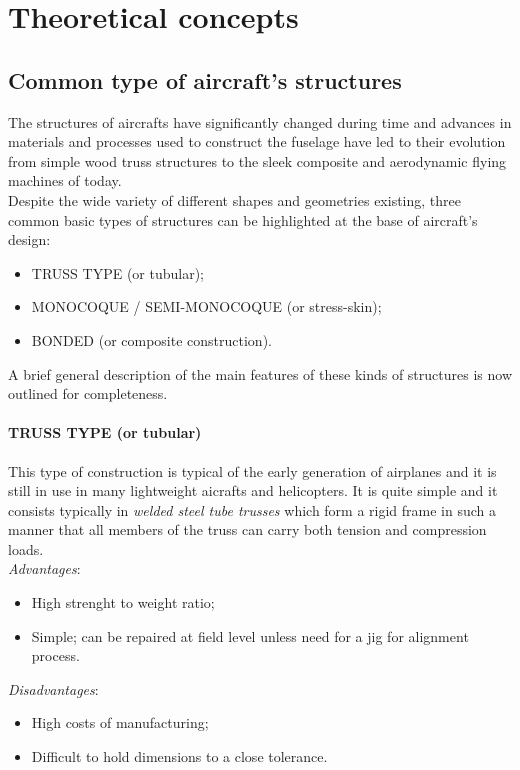 \chapter{Theoretical concepts}


\section*{Common type of aircraft's structures}
\noindent
The structures of aircrafts have significantly changed during time and advances in materials and processes used to construct the fuselage have led to their evolution from simple wood truss structures to the sleek composite and aerodynamic flying machines of today. \\
Despite the wide variety of different shapes and geometries existing, three common basic types of structures can be highlighted at the base of aircraft's design: 
\begin{itemize}
	\item TRUSS TYPE (or tubular);
	\item MONOCOQUE / SEMI-MONOCOQUE (or stress-skin);
	\item BONDED (or composite construction).
\end{itemize}  


\noindent A brief general description of the main features of these kinds of structures is now outlined for completeness.
\smallskip
\noindent 
\subsubsection*{TRUSS TYPE (or tubular)}
\noindent This type of construction is typical of the early generation of airplanes and it is still in use in many lightweight aicrafts and helicopters. It is quite simple and it consists typically in \emph{welded steel tube trusses} which form a rigid frame in such a manner that all members
of the truss can carry both tension and compression loads. \\ 

\smallskip
\noindent 
\emph{Advantages}: 
\begin{itemize}
	\item High strenght to weight ratio;
	\item Simple; can be repaired at field level unless need for a jig for alignment process.
\end{itemize}


\smallskip
\noindent 
\emph{Disadvantages}: \begin{itemize}
	\item High costs of manufacturing;
	\item Difficult to hold dimensions to a close tolerance.
\end{itemize}

